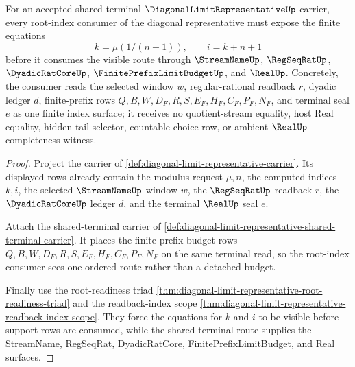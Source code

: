 \begin{theorem}
\label{thm:diagonal-limit-representative-root-index-coverage}
For an accepted shared-terminal $\DiagonalLimitRepresentativeUp$ carrier, every root-index consumer of the diagonal representative must expose the finite equations
$$
k=\mu(1/(n+1)),\qquad i=k+n+1
$$
before it consumes the visible route through $\StreamNameUp$, $\RegSeqRatUp$, $\DyadicRatCoreUp$, $\FinitePrefixLimitBudgetUp$, and $\RealUp$. Concretely, the consumer reads the selected window $w$, regular-rational readback $r$, dyadic ledger $d$, finite-prefix rows $Q,B,W,D_F,R,S,E_F,H_F,C_F,P_F,N_F$, and terminal seal $e$ as one finite index surface; it receives no quotient-stream equality, host Real equality, hidden tail selector, countable-choice row, or ambient $\RealUp$ completeness witness.
\end{theorem}
\begin{proof}
Project the carrier of \autoref{def:diagonal-limit-representative-carrier}. Its displayed rows already contain the modulus request $\mu,n$, the computed indices $k,i$, the selected $\StreamNameUp$ window $w$, the $\RegSeqRatUp$ readback $r$, the $\DyadicRatCoreUp$ ledger $d$, and the terminal $\RealUp$ seal $e$.

Attach the shared-terminal carrier of \autoref{def:diagonal-limit-representative-shared-terminal-carrier}. It places the finite-prefix budget rows $Q,B,W,D_F,R,S,E_F,H_F,C_F,P_F,N_F$ on the same terminal read, so the root-index consumer sees one ordered route rather than a detached budget.

Finally use the root-readiness triad \autoref{thm:diagonal-limit-representative-root-readiness-triad} and the readback-index scope \autoref{thm:diagonal-limit-representative-readback-index-scope}. They force the equations for $k$ and $i$ to be visible before support rows are consumed, while the shared-terminal route supplies the StreamName, RegSeqRat, DyadicRatCore, FinitePrefixLimitBudget, and Real surfaces.
\end{proof}

